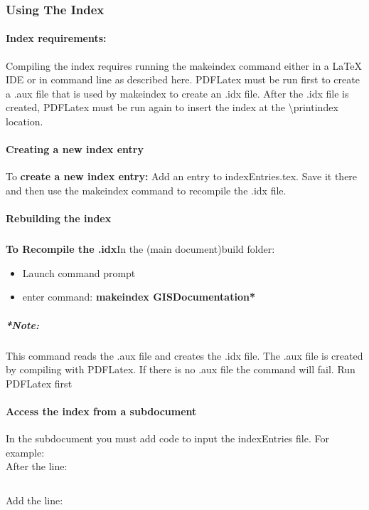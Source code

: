 \subsubsection[Using The Index]{{\Large Using The Index}}
\paragraph{Index requirements:}
Compiling the index requires running the makeindex command either in a \LaTeX{} IDE or in command line as described here.  PDFLatex must be run first to create a .aux file that is used by makeindex to create an .idx file.  After the .idx file is created, PDFLatex must be run again to insert the index at the \textbackslash printindex location.

\paragraph{Creating a new index entry}
To \textbf{create a new index entry:} Add an entry to indexEntries.tex.  Save it there and then use the makeindex command to recompile the .idx file.

\paragraph{Rebuilding the index}
\subparagraph*{}\textbf{To Recompile the .idx}In the (main document)build folder:
\begin{itemize}
\item Launch command prompt
\item enter command: \textbf{{\large makeindex GISDocumentation*}}
\end{itemize}
\subparagraph{*Note:} {\footnotesize This command reads the .aux file and creates the .idx file.  The .aux file is created by compiling with PDFLatex.  If there is no .aux file the command will fail. Run PDFLatex first}

\paragraph{Access the index from a subdocument}
In the subdocument you must add code to input the indexEntries file.  For example:\\
After the line:
\begin{verbatim}

\end{verbatim}
Add the line:
\begin{verbatim}

\end{verbatim}

